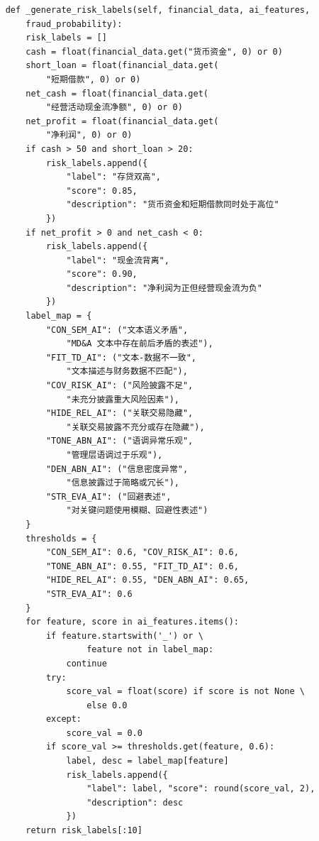 \documentclass[a4paper,10pt]{article}
\begin{document}
\begin{lstlisting}
    def _generate_risk_labels(self, financial_data, ai_features,
        fraud_probability):
        risk_labels = []
        cash = float(financial_data.get("货币资金", 0) or 0)
        short_loan = float(financial_data.get(
            "短期借款", 0) or 0)
        net_cash = float(financial_data.get(
            "经营活动现金流净额", 0) or 0)
        net_profit = float(financial_data.get(
            "净利润", 0) or 0)
        if cash > 50 and short_loan > 20:
            risk_labels.append({
                "label": "存贷双高",
                "score": 0.85,
                "description": "货币资金和短期借款同时处于高位"
            })
        if net_profit > 0 and net_cash < 0:
            risk_labels.append({
                "label": "现金流背离",
                "score": 0.90,
                "description": "净利润为正但经营现金流为负"
            })
        label_map = {
            "CON_SEM_AI": ("文本语义矛盾",
                "MD&A 文本中存在前后矛盾的表述"),
            "FIT_TD_AI": ("文本-数据不一致",
                "文本描述与财务数据不匹配"),
            "COV_RISK_AI": ("风险披露不足",
                "未充分披露重大风险因素"),
            "HIDE_REL_AI": ("关联交易隐藏",
                "关联交易披露不充分或存在隐藏"),
            "TONE_ABN_AI": ("语调异常乐观",
                "管理层语调过于乐观"),
            "DEN_ABN_AI": ("信息密度异常",
                "信息披露过于简略或冗长"),
            "STR_EVA_AI": ("回避表述",
                "对关键问题使用模糊、回避性表述")
        }
        thresholds = {
            "CON_SEM_AI": 0.6, "COV_RISK_AI": 0.6,
            "TONE_ABN_AI": 0.55, "FIT_TD_AI": 0.6,
            "HIDE_REL_AI": 0.55, "DEN_ABN_AI": 0.65,
            "STR_EVA_AI": 0.6
        }
        for feature, score in ai_features.items():
            if feature.startswith('_') or \
                    feature not in label_map:
                continue
            try:
                score_val = float(score) if score is not None \
                    else 0.0
            except:
                score_val = 0.0
            if score_val >= thresholds.get(feature, 0.6):
                label, desc = label_map[feature]
                risk_labels.append({
                    "label": label, "score": round(score_val, 2),
                    "description": desc
                })
        return risk_labels[:10]
\end{lstlisting}
\end{document}
